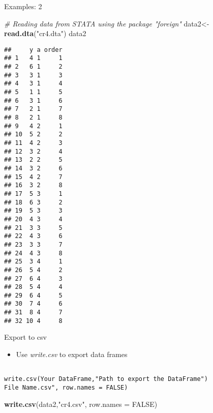 \documentclass[
  ignorenonframetext,
]{beamer}
\newenvironment{Shaded}{\begin{snugshade}}{\end{snugshade}}
\newcommand{\CommentTok}[1]{\textcolor[rgb]{0.56,0.35,0.01}{\textit{#1}}}
\newcommand{\DataTypeTok}[1]{\textcolor[rgb]{0.13,0.29,0.53}{#1}}
\newcommand{\KeywordTok}[1]{\textcolor[rgb]{0.13,0.29,0.53}{\textbf{#1}}}
\newcommand{\NormalTok}[1]{#1}
\newcommand{\OtherTok}[1]{\textcolor[rgb]{0.56,0.35,0.01}{#1}}
\newcommand{\StringTok}[1]{\textcolor[rgb]{0.31,0.60,0.02}{#1}}
\providecommand{\tightlist}{%
  \setlength{\itemsep}{0pt}\setlength{\parskip}{0pt}}
\begin{document}
\begin{frame}[fragile]{Examples: 2}
\protect\hypertarget{examples-2}{}

\begin{Shaded}
\begin{Highlighting}[]
\CommentTok{# Reading data from STATA using the package "foreign"}
\NormalTok{data2<-}\KeywordTok{read.dta}\NormalTok{(}\StringTok{"cr4.dta"}\NormalTok{)}
\NormalTok{data2}
\end{Highlighting}
\end{Shaded}

\begin{verbatim}
##     y a order
## 1   4 1     1
## 2   6 1     2
## 3   3 1     3
## 4   3 1     4
## 5   1 1     5
## 6   3 1     6
## 7   2 1     7
## 8   2 1     8
## 9   4 2     1
## 10  5 2     2
## 11  4 2     3
## 12  3 2     4
## 13  2 2     5
## 14  3 2     6
## 15  4 2     7
## 16  3 2     8
## 17  5 3     1
## 18  6 3     2
## 19  5 3     3
## 20  4 3     4
## 21  3 3     5
## 22  4 3     6
## 23  3 3     7
## 24  4 3     8
## 25  3 4     1
## 26  5 4     2
## 27  6 4     3
## 28  5 4     4
## 29  6 4     5
## 30  7 4     6
## 31  8 4     7
## 32 10 4     8
\end{verbatim}

\end{frame}

\begin{frame}[fragile]{Export to csv}
\protect\hypertarget{export-to-csv}{}

\begin{itemize}
\tightlist
\item
  Use \emph{write.csv} to export data frames
\end{itemize}

\begin{verbatim}

write.csv(Your DataFrame,"Path to export the DataFrame")
File Name.csv", row.names = FALSE)
\end{verbatim}

\begin{Shaded}
\begin{Highlighting}[]
\KeywordTok{write.csv}\NormalTok{(data2,}\StringTok{"cr4.csv"}\NormalTok{, }\DataTypeTok{row.names =} \OtherTok{FALSE}\NormalTok{)}
\end{Highlighting}
\end{Shaded}

\end{frame}
\end{document}
